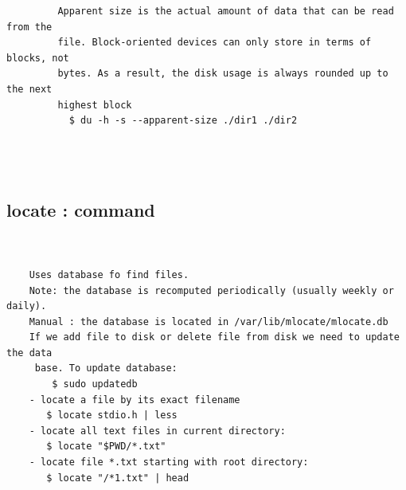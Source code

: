 \documentclass[a4paper,12pt]{article}
\begin{document}
\begin{verbatim}
         Apparent size is the actual amount of data that can be read from the 
         file. Block-oriented devices can only store in terms of blocks, not 
         bytes. As a result, the disk usage is always rounded up to the next 
         highest block     
           $ du -h -s --apparent-size ./dir1 ./dir2  
            
            
             
\end{verbatim}




\subsection{locate   :  command}
\begin{verbatim}


    Uses database fo find files.
    Note: the database is recomputed periodically (usually weekly or daily).
    Manual : the database is located in /var/lib/mlocate/mlocate.db
    If we add file to disk or delete file from disk we need to update the data 
     base. To update database:
        $ sudo updatedb
    - locate a file by its exact filename
       $ locate stdio.h | less
    - locate all text files in current directory:       
       $ locate "$PWD/*.txt"
    - locate file *.txt starting with root directory:
       $ locate "/*1.txt" | head



\end{verbatim}
\end{document}
